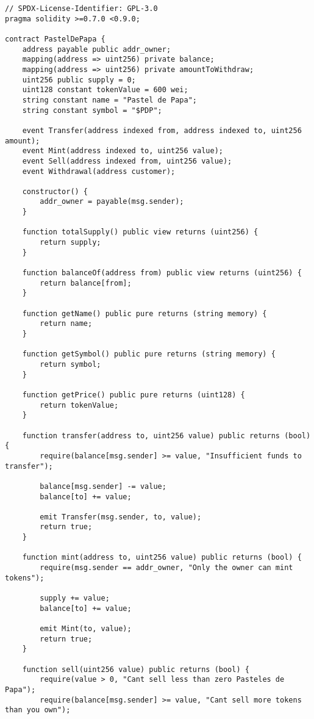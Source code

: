 \documentclass[12pt]{article}
\begin{document}
\begin{lstlisting}[language=Solidity]
// SPDX-License-Identifier: GPL-3.0
pragma solidity >=0.7.0 <0.9.0;

contract PastelDePapa {
    address payable public addr_owner;
    mapping(address => uint256) private balance;
    mapping(address => uint256) private amountToWithdraw;
    uint256 public supply = 0;
    uint128 constant tokenValue = 600 wei;
    string constant name = "Pastel de Papa";
    string constant symbol = "$PDP";
    
    event Transfer(address indexed from, address indexed to, uint256 amount);
    event Mint(address indexed to, uint256 value);
    event Sell(address indexed from, uint256 value);
    event Withdrawal(address customer);

    constructor() {
        addr_owner = payable(msg.sender); 
    }

    function totalSupply() public view returns (uint256) {
        return supply; 
    }

    function balanceOf(address from) public view returns (uint256) {
        return balance[from];
    }   
    
    function getName() public pure returns (string memory) {
        return name;
    }  

    function getSymbol() public pure returns (string memory) {
        return symbol;
    }

    function getPrice() public pure returns (uint128) {
        return tokenValue;
    }
    
    function transfer(address to, uint256 value) public returns (bool) {
        require(balance[msg.sender] >= value, "Insufficient funds to transfer");

        balance[msg.sender] -= value;
        balance[to] += value;

        emit Transfer(msg.sender, to, value);
        return true;  
    }

    function mint(address to, uint256 value) public returns (bool) {
        require(msg.sender == addr_owner, "Only the owner can mint tokens");

        supply += value; 
        balance[to] += value;

        emit Mint(to, value);
        return true;
    }

    function sell(uint256 value) public returns (bool) {
        require(value > 0, "Cant sell less than zero Pasteles de Papa");
        require(balance[msg.sender] >= value, "Cant sell more tokens than you own");


\end{lstlisting}
\end{document}
